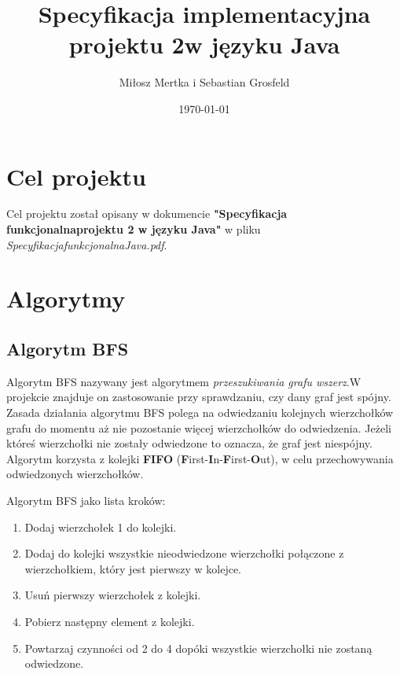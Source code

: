 \documentclass{article}
\title{Specyfikacja implementacyjna projektu 2\linebreak w języku Java}
\author{Miłosz Mertka i Sebastian Grosfeld}
\date{\today}
\begin{document}
\maketitle

\tableofcontents

\newpage

\setlength{\headheight}{23pt}

\section{Cel projektu}
Cel projektu został opisany w dokumencie \textbf{"Specyfikacja funkcjonalna\linebreak projektu 2 w języku Java"} w pliku \emph{Specyfikacja\textunderscore funkcjonalna\textunderscore Java.pdf}.

\section{Algorytmy}
\subsection{Algorytm BFS}
Algorytm BFS nazywany jest algorytmem \emph{przeszukiwania grafu wszerz}.\linebreak W projekcie znajduje on zastosowanie przy sprawdzaniu, czy dany graf jest spójny. Zasada działania algorytmu BFS polega na odwiedzaniu kolejnych wierzchołków grafu do momentu aż nie pozostanie więcej wierzchołków do odwiedzenia. Jeżeli któreś wierzchołki nie zostały odwiedzone to oznacza, że graf jest niespójny. Algorytm korzysta z kolejki \textbf{FIFO} (\textbf{F}irst-\textbf{I}n-\textbf{F}irst-\textbf{O}ut), w celu przechowywania odwiedzonych wierzchołków.

\medskip

\noindent Algorytm BFS jako lista kroków:
\begin{enumerate}
    \item Dodaj wierzchołek 1 do kolejki.
    \item Dodaj do kolejki wszystkie nieodwiedzone wierzchołki połączone z wierzchołkiem, który jest pierwszy w kolejce.
    \item Usuń pierwszy wierzchołek z kolejki.
    \item Pobierz następny element z kolejki.
    \item Powtarzaj czynności od 2 do 4 dopóki wszystkie wierzchołki nie zostaną odwiedzone.
\end{enumerate}
\end{document}
